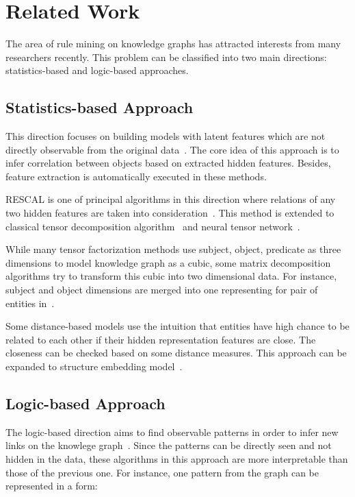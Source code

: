 \chapter{Related Work}

The area of rule mining on knowledge graphs has attracted interests from many researchers recently. This problem can be classified into two main directions: statistics-based and logic-based approaches.

\section{Statistics-based Approach}

This direction focuses on building models with latent features which are not directly observable from the original data~\cite{ref1}. The core idea of this approach is to infer correlation between objects based on extracted hidden features. Besides, feature extraction is automatically executed in these methods.

RESCAL is one of principal algorithms in this direction where relations of any two hidden features are taken into consideration~\cite{ref2, ref3}. This method is extended to classical tensor decomposition algorithm~\cite{ref4} and neural tensor network~\cite{ref5}.

While many tensor factorization methods use subject, object, predicate as three dimensions to model knowledge graph as a cubic, some matrix decomposition algorithms try to transform this cubic into two dimensional data. For instance, subject and object dimensions are merged into one representing for pair of entities in~\cite{ref6, ref7}.

Some distance-based models use the intuition that entities have high chance to be related to each other if their hidden representation features are close. The closeness can be checked based on some distance measures. This approach can be expanded to structure embedding model~\cite{ref8}.

\section{Logic-based Approach}

The logic-based direction aims to find observable patterns in order to infer new links on the knowlege graph~\cite{ref1}. Since the patterns can be directly seen and not hidden in the data, these algorithms in this approach are more interpretable than those of the previous one. For instance, one pattern from the graph can be represented in a form:\\

